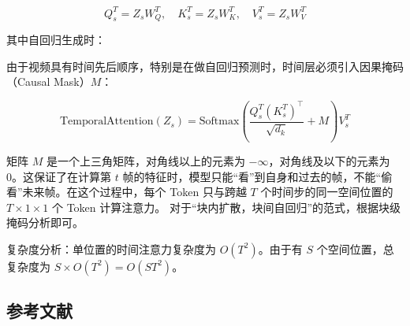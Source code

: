 \[
Q_s^T=Z_sW_Q^T,\quad K_s^T=Z_sW_K^T,\quad V_s^T=Z_sW_V^T
\]

其中自回归生成时：

由于视频具有时间先后顺序，特别是在做自回归预测时，时间层必须引入因果掩码（Causal Mask）\(M\)：

\[
\mathrm{TemporalAttention}(Z_s)=\mathrm{Softmax}\left(\frac{Q_s^T(K_s^T)^\top}{\sqrt{d_k}}+M\right)V_s^T
\]

矩阵 \(M\) 是一个上三角矩阵，对角线以上的元素为 \(-\infty\)，对角线及以下的元素为 0。这保证了在计算第 \(t\) 帧的特征时，模型只能``看''到自身和过去的帧，不能``偷看''未来帧。在这个过程中，每个 Token 只与跨越 \(T\) 个时间步的同一空间位置的 \(T\times 1\times 1\) 个 Token 计算注意力。
对于``块内扩散，块间自回归''的范式，根据块级掩码分析即可。

复杂度分析：单位置的时间注意力复杂度为 \(O(T^2)\)。由于有 \(S\) 个空间位置，总复杂度为 \(S\times O(T^2)=O(ST^2)\)。

\hypertarget{ux53c2ux8003ux6587ux732e-138}{%
\subsection{参考文献}\label{ux53c2ux8003ux6587ux732e-138}}

